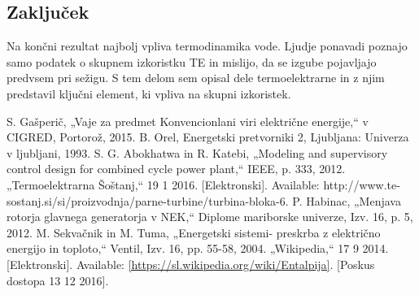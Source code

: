 \documentclass[a4paper,10pt]{article}
\begin{document}
\begin{multicols}{2}
\section{Zaključek}
Na končni rezultat najbolj vpliva termodinamika vode. Ljudje ponavadi poznajo samo podatek o skupnem izkoristku TE in mislijo, da se izgube pojavljajo predvsem pri sežigu. S tem delom sem opisal dele termoelektrarne in z njim predstavil ključni element, ki vpliva na skupni izkoristek. 
\small
\begin{thebibliography}{} 
S. Gašperič, „Vaje za predmet Konvencionlani viri električne energije,“ v CIGRED, Portorož, 2015. 
B. Orel, Energetski pretvorniki 2, Ljubljana: Univerza v ljubljani, 1993. 
S. G. Abokhatwa in R. Katebi, „Modeling and supervisory control design for combined cycle power plant,“ IEEE, p. 333, 2012. 
„Termoelektrarna Šoštanj,“ 19 1 2016. [Elektronski]. Available: http://www.te-sostanj.si/si/proizvodnja/parne-turbine/turbina-bloka-6.
P. Habinac, „Menjava rotorja glavnega generatorja v NEK,“ Diplome mariborske univerze, Izv. 16, p. 5, 2012. 
M. Sekvačnik in M. Tuma, „Energetski sistemi- preskrba z električno energijo in toploto,“ Ventil, Izv. 16, pp. 55-58, 2004. 
„Wikipedia,“ 17 9 2014. [Elektronski]. Available: \ref{https://sl.wikipedia.org/wiki/Entalpija}. [Poskus dostopa 13 12 2016].
\end{thebibliography}
\normalsize
\end{multicols}
\end{document}
